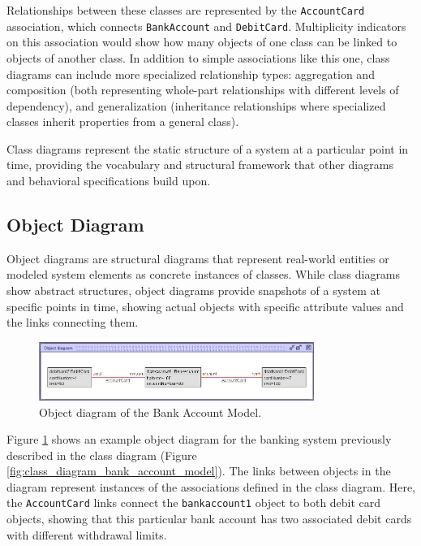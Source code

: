Relationships between these classes are represented by the \texttt{AccountCard} 
association, which connects \texttt{BankAccount} and \texttt{DebitCard}. 
Multiplicity indicators on this association would show how many objects of one class 
can be linked to objects of another class. In addition to simple associations like 
this one, class diagrams can include more specialized relationship types: aggregation 
and composition (both representing whole-part relationships with different levels of 
dependency), and generalization (inheritance relationships where specialized classes 
inherit properties from a general class).

Class diagrams represent the static structure of a system at a particular point in 
time, providing the vocabulary and structural framework that other diagrams and 
behavioral specifications build upon.


\subsection{Object Diagram}
Object diagrams are structural diagrams that represent real-world entities or 
modeled system elements as concrete instances of classes. While class diagrams 
show abstract structures, object diagrams provide snapshots of a system at specific 
points in time, showing actual objects with specific attribute values and the links 
connecting them.

\begin{figure}
    \begin{center}
        \includegraphics[width=0.8\textwidth]{figures/c1/BankAccount/BA_ObjectDiagram.png}
        \caption{Object diagram of the Bank Account Model.}
        \label{fig:object_diagram_bank_account_model}
    \end{center}
\end{figure}

Figure \ref{fig:object_diagram_bank_account_model} shows an example object diagram for the banking system previously described in the class diagram (Figure \ref{fig:class_diagram_bank_account_model}).
The links between objects in the diagram represent instances of the associations defined in the class diagram. Here, the \texttt{AccountCard} links connect the \texttt{bankaccount1} object to both debit card objects, showing that this particular bank account has two associated debit cards with different withdrawal limits.

